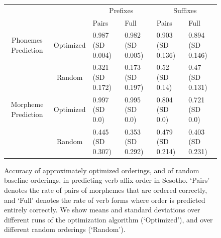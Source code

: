 \begin{figure}
\begin{tabular}{cc||ll|ll}
             &              & \multicolumn{2}{c}{Prefixes}    & \multicolumn{2}{|c}{Suffixes} \\
             &              & Pairs & Full & Pairs & Full \\ \hline\hline
Phonemes Prediction   &   Optimized  &  0.987 (SD 0.004) & 0.982 (SD 0.005) & 0.903 (SD 0.136) & 0.894 (SD 0.146) \\ 
           &   Random     &  0.321 (SD 0.172) & 0.173 (SD 0.197) & 0.52 (SD 0.14) & 0.47 (SD 0.131) \\ \hline
Morpheme Prediction  &   Optimized  &  0.997 (SD 0.0) & 0.995 (SD 0.0) & 0.804 (SD 0.0) & 0.721 (SD 0.0) \\
           &   Random  &  0.445 (SD 0.307) & 0.353 (SD 0.292) & 0.479 (SD 0.214) & 0.403 (SD 0.231) \\
\end{tabular}
\caption{Accuracy of approximately optimized orderings, and of random baseline orderings, in predicting verb affix order in Sesotho. `Pairs' denotes the rate of pairs of morphemes that are ordered correctly, and `Full' denotes the rate of verb forms where order is predicted entirely correctly. We show means and standard deviations over different runs of the optimization algorithm (`Optimized'), and over different random orderings (`Random').}\label{fig:acc-sesotho}
\end{figure}




